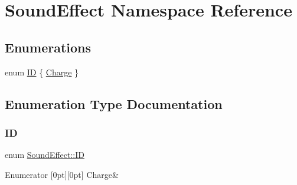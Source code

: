 \hypertarget{namespace_sound_effect}{}\section{Sound\+Effect Namespace Reference}
\label{namespace_sound_effect}
\subsection*{Enumerations}
\begin{DoxyCompactItemize}
\item 
enum \hyperlink{namespace_sound_effect_a11ffbf1eb89e85a34cbfd5a59b2cd9cb}{ID} \{ \hyperlink{namespace_sound_effect_a11ffbf1eb89e85a34cbfd5a59b2cd9cba089c46ca5650d2908d73313697639681}{Charge}
 \}
\end{DoxyCompactItemize}


\subsection{Enumeration Type Documentation}
\hypertarget{namespace_sound_effect_a11ffbf1eb89e85a34cbfd5a59b2cd9cb}{}\label{namespace_sound_effect_a11ffbf1eb89e85a34cbfd5a59b2cd9cb} 
\subsubsection{\texorpdfstring{ID}{ID}}
{\footnotesize\ttfamily enum \hyperlink{namespace_sound_effect_a11ffbf1eb89e85a34cbfd5a59b2cd9cb}{Sound\+Effect\+::\+ID}}

\begin{DoxyEnumFields}{Enumerator}
[0pt][0pt]{}\hypertarget{namespace_sound_effect_a11ffbf1eb89e85a34cbfd5a59b2cd9cba089c46ca5650d2908d73313697639681}{}\label{namespace_sound_effect_a11ffbf1eb89e85a34cbfd5a59b2cd9cba089c46ca5650d2908d73313697639681} 
Charge&\\
\hline

\end{DoxyEnumFields}
